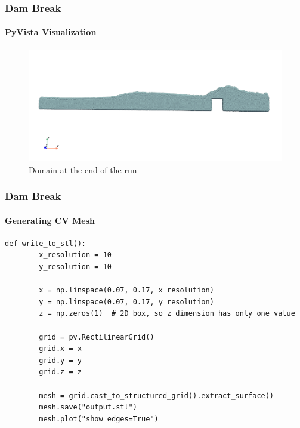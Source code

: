 \documentclass[notheorems, aspectratio=169]{beamer}
\begin{document}
  \begin{frame}
    \frametitle{Dam Break}
    \framesubtitle{PyVista Visualization}
    
    \begin{figure}
      \centering
      \includegraphics[width=0.8\linewidth]{pictures/domain_10000.png} 
      \caption{Domain at the end of the run}
    \end{figure}
  
  \end{frame}
 
  
  \begin{frame}[fragile]
    \frametitle{Dam Break}
    \framesubtitle{Generating CV Mesh}
    
    \begin{lstlisting}[style = python]
      def write_to_stl():
        x_resolution = 10
        y_resolution = 10
    
        x = np.linspace(0.07, 0.17, x_resolution)
        y = np.linspace(0.07, 0.17, y_resolution)
        z = np.zeros(1)  # 2D box, so z dimension has only one value
    
        grid = pv.RectilinearGrid()
        grid.x = x
        grid.y = y
        grid.z = z
    
        mesh = grid.cast_to_structured_grid().extract_surface()
        mesh.save("output.stl")
        mesh.plot("show_edges=True")
    \end{lstlisting}
    
  \end{frame}
  

  
\end{document}
